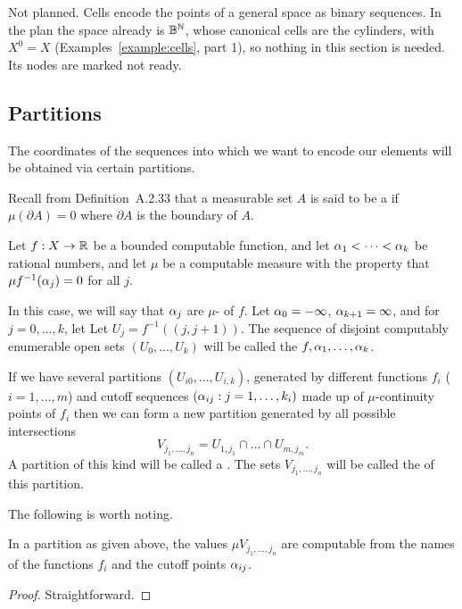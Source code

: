 \begin{formalization}
Not planned. Cells encode the points of a general space as binary sequences. In the plan the
space already is $\mathbb{B}^{\mathbb{N}}$, whose canonical cells are the cylinders, with $X^{0} = X$
(Examples~\ref{example:cells}, part 1), so nothing in this section is needed. Its nodes are
marked not ready.
\end{formalization}

\subsection{Partitions}

The coordinates of the sequences into which we want to encode our elements will
be obtained via certain partitions.

Recall from Definition~A.2.33 that 
a measurable set \( A \) is said to be a  if 
\( \mu(\partial A)=0 \) where \( \partial A \) is the boundary of \( A \).

 \begin{definition}
  \label{def:g4.7.1}
  \notready
Let \( f:X\to\mathbb{R} \) be a bounded computable function, and let
\( \alpha_{1}<\dots<\alpha_{k} \) be rational numbers,
and let \( \mu \) be a computable measure with the property
that \( \mu f^{-1}(\alpha_{j})=0 \) for all \( j \).


In this case, we will say that \( \alpha_{j} \) are \( \mu \)- of \( f \).
Let \( \alpha_{0}=-\infty \), \( \alpha_{k+1}=\infty \), and for \( j=0,\dots,k \), let
Let \( U_{j} = f^{-1}((j,j+1)) \).
The sequence of disjoint 
computably enumerable open sets \( (U_{0},\dots,U_{k}) \) will be called the
 \( f,\alpha_{1},\dots,\alpha_{k} \).

If we have several partitions \( (U_{i0},\dots,U_{i,k}) \), 
generated by different functions \( f_{i} \) (\( i=1,\dots,m \))
and cutoff sequences \( (\alpha_{ij}: j=1,\dots,k_{i}) \)  made up of
\( \mu \)-continuity points of \( f_{i} \)
then we can form a new partition generated by all possible intersections
 \[
  V_{j_{1},\dots,j_{n}} = U_{1,j_{1}}\cap \dots \cap U_{m,j_{m}}.
 \]
A partition of this kind will be called a .
The sets \( V_{j_{1},\dots,j_{n}} \) will be called the  of this
partition. 
 \end{definition}

The following is worth noting.

 \begin{proposition}\label{propo:reg-partit-meas-cptable}
  \notready
In a partition as given above, 
the values \( \mu V_{j_{1},\dots,j_{n}} \) are computable
from the names of the functions \( f_{i} \) and the cutoff points \( \alpha_{ij} \).
 \end{proposition}
 \begin{proof}
  \notready
Straightforward.
 \end{proof}

